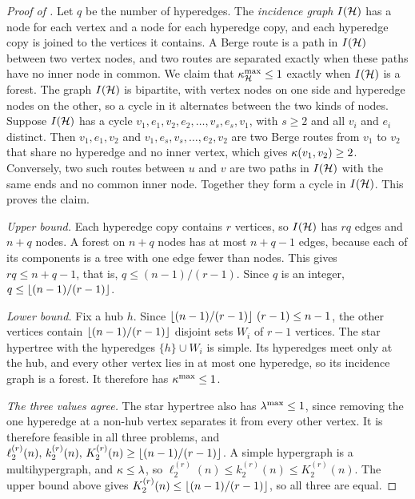 \begin{proof}[Proof of ]
Let $q$ be the number of hyperedges.
The \emph{incidence graph} $I(\mathcal{H})$ has a node for each vertex and a node for each hyperedge copy, and each hyperedge copy is joined to the vertices it contains.
A Berge route is a path in $I(\mathcal{H})$ between two vertex nodes, and two routes are separated exactly when these paths have no inner node in common.
We claim that $\kappa^{\max}_{\mathcal{H}} \le 1$ exactly when $I(\mathcal{H})$ is a forest.
The graph $I(\mathcal{H})$ is bipartite, with vertex nodes on one side and hyperedge nodes on the other, so a cycle in it alternates between the two kinds of nodes.
Suppose $I(\mathcal{H})$ has a cycle $v_1, e_1, v_2, e_2, \dots, v_s, e_s, v_1$, with $s\ge2$ and all $v_i$ and $e_i$ distinct.
Then $v_1, e_1, v_2$ and $v_1, e_s, v_s, \dots, e_2, v_2$ are two Berge routes from $v_1$ to $v_2$ that share no hyperedge and no inner vertex, which gives $\kappa(v_1, v_2) \ge 2$.
Conversely, two such routes between $u$ and $v$ are two paths in $I(\mathcal{H})$ with the same ends and no common inner node. Together they form a cycle in $I(\mathcal{H})$.
This proves the claim.

\emph{Upper bound.}
Each hyperedge copy contains $r$ vertices, so $I(\mathcal{H})$ has $rq$ edges and $n + q$ nodes.
A forest on $n + q$ nodes has at most $n + q - 1$ edges, because each of its components is a tree with one edge fewer than nodes.
This gives $rq \le n + q - 1$, that is, $q \le (n-1)/(r-1)$. Since $q$ is an integer, $q \le \left\lfloor (n-1)/(r-1) \right\rfloor$.

\emph{Lower bound.}
Fix a hub $h$. Since $\left\lfloor (n-1)/(r-1) \right\rfloor\,(r-1) \le n-1$, the other vertices contain $\left\lfloor (n-1)/(r-1) \right\rfloor$ disjoint sets $W_i$ of $r-1$ vertices.
The star hypertree with the hyperedges $\{h\} \cup W_i$ is simple.
Its hyperedges meet only at the hub, and every other vertex lies in at most one hyperedge, so its incidence graph is a forest. It therefore has $\kappa^{\max} \le 1$.

\emph{The three values agree.}
The star hypertree also has $\lambda^{\max} \le 1$, since removing the one hyperedge at a non-hub vertex separates it from every other vertex.
It is therefore feasible in all three problems, and $\ell_2^{(r)}(n),\, k_2^{(r)}(n),\, K_2^{(r)}(n) \ge \left\lfloor (n-1)/(r-1) \right\rfloor$.
A simple hypergraph is a multihypergraph, and $\kappa \le \lambda$, so $\ell_2^{(r)}(n) \le k_2^{(r)}(n) \le K_2^{(r)}(n)$. The upper bound above gives $K_2^{(r)}(n) \le \left\lfloor (n-1)/(r-1) \right\rfloor$, so all three are equal.
\end{proof}

